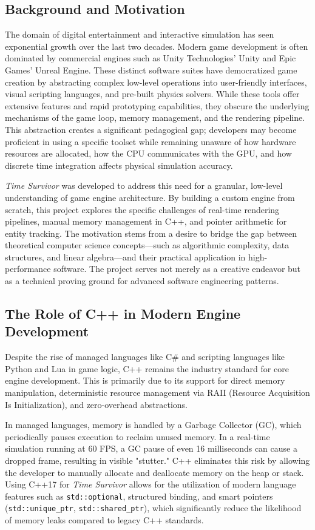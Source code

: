 \documentclass[10pt, a4paper]{article}
\begin{document}
\subsection{Background and Motivation}
The domain of digital entertainment and interactive simulation has seen exponential growth over the last two decades. Modern game development is often dominated by commercial engines such as Unity Technologies' Unity and Epic Games' Unreal Engine. These distinct software suites have democratized game creation by abstracting complex low-level operations into user-friendly interfaces, visual scripting languages, and pre-built physics solvers. While these tools offer extensive features and rapid prototyping capabilities, they obscure the underlying mechanisms of the game loop, memory management, and the rendering pipeline. This abstraction creates a significant pedagogical gap; developers may become proficient in using a specific toolset while remaining unaware of how hardware resources are allocated, how the CPU communicates with the GPU, and how discrete time integration affects physical simulation accuracy.

\textit{Time Survivor} was developed to address this need for a granular, low-level understanding of game engine architecture. By building a custom engine from scratch, this project explores the specific challenges of real-time rendering pipelines, manual memory management in C++, and pointer arithmetic for entity tracking. The motivation stems from a desire to bridge the gap between theoretical computer science concepts—such as algorithmic complexity, data structures, and linear algebra—and their practical application in high-performance software. The project serves not merely as a creative endeavor but as a technical proving ground for advanced software engineering patterns.

\subsection{The Role of C++ in Modern Engine Development}
Despite the rise of managed languages like C\# and scripting languages like Python and Lua in game logic, C++ remains the industry standard for core engine development. This is primarily due to its support for direct memory manipulation, deterministic resource management via RAII (Resource Acquisition Is Initialization), and zero-overhead abstractions. 

In managed languages, memory is handled by a Garbage Collector (GC), which periodically pauses execution to reclaim unused memory. In a real-time simulation running at 60 FPS, a GC pause of even 16 milliseconds can cause a dropped frame, resulting in visible "stutter." C++ eliminates this risk by allowing the developer to manually allocate and deallocate memory on the heap or stack. Using C++17 for \textit{Time Survivor} allows for the utilization of modern language features such as \texttt{std::optional}, structured binding, and smart pointers (\texttt{std::unique\_ptr}, \texttt{std::shared\_ptr}), which significantly reduce the likelihood of memory leaks compared to legacy C++ standards.
\end{document}

